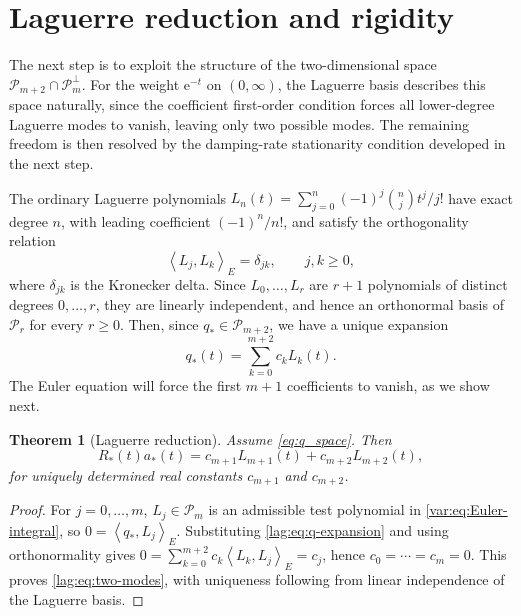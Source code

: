\documentclass[11pt]{article}
\numberwithin{equation}{section}
\newtheorem{theorem}{Theorem}[section]
\theoremstyle{definition}
\theoremstyle{remark}
\newcommand{\Pcal}{\mathcal P}
\newcommand{\e}{\mathrm e}
\newcommand{\ip}[2]{\left\langle #1,#2\right\rangle_{E}}
\begin{document}
\section{Laguerre reduction and rigidity}\label{sec:laguerre-rigidity}

The next step is to exploit the structure of the two-dimensional space $\Pcal_{m+2}\cap\Pcal_m^\perp$. For the weight $\e^{-t}$ on $(0,\infty)$, the Laguerre basis describes this space naturally, since the coefficient first-order condition forces all lower-degree Laguerre modes to vanish, leaving only two possible modes. The remaining freedom is then resolved by the damping-rate stationarity condition developed in the next step.


The ordinary Laguerre polynomials $L_n(t)=\sum_{j=0}^n(-1)^j\binom{n}{j}t^j/j!$ have exact degree $n$, with leading coefficient $(-1)^n/n!$, and satisfy the orthogonality relation
\begin{equation*}
    \ip{L_j}{L_k}
    =\delta_{jk}, \qquad j,k\mathrel{{\geq}}0,
\end{equation*}
where $\delta_{jk}$ is the Kronecker delta. Since $L_0,\ldots,L_r$ are $r+1$ polynomials of distinct degrees $0,\ldots,r$, they are linearly independent, and hence an orthonormal basis of $\Pcal_r$ for every $r\ge0$.
Then, since $q_*\in\Pcal_{m+2}$, we have a unique expansion
\begin{equation}\label{lag:eq:q-expansion}
    q_*(t)=\sum_{k=0}^{m+2}c_kL_k(t).
\end{equation}
The Euler equation will force the first $m+1$ coefficients to vanish, as we show next.
\begin{theorem}[Laguerre reduction]\label{lag:thm:reduction}
Assume \eqref{eq:q_space}.
Then
\begin{equation}\label{lag:eq:two-modes}
    R_*(t)a_*(t)
    =c_{m+1}L_{m+1}(t)+c_{m+2}L_{m+2}(t),
\end{equation}
for uniquely determined real constants $c_{m+1}$ and $c_{m+2}$.
\end{theorem}

\begin{proof}
For $j=0,\ldots,m$, $L_j\in\Pcal_m$ is an admissible test polynomial in \eqref{var:eq:Euler-integral}, so $0=\ip{q_*}{L_j}$. Substituting \eqref{lag:eq:q-expansion} and using orthonormality gives $0=\sum_{k=0}^{m+2}c_k\ip{L_k}{L_j}=c_j$, hence $c_0=\cdots=c_m=0$. This proves \eqref{lag:eq:two-modes}, with uniqueness following from linear independence of the Laguerre basis.
\end{proof}
\end{document}
